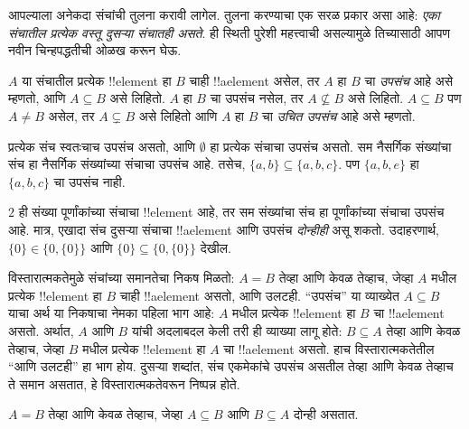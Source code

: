\documentclass[../../../include/open-logic-section]{subfiles}
\begin{document}

\begin{explain}
आपल्याला अनेकदा संचांची तुलना करावी लागेल. तुलना करण्याचा एक सरळ प्रकार
असा आहे: \emph{एका संचातील प्रत्येक वस्तू दुसऱ्या संचातही असते}.
ही स्थिती पुरेशी महत्त्वाची असल्यामुळे तिच्यासाठी आपण नवीन चिन्हपद्धतीची
ओळख करून घेऊ.
\end{explain}

\begin{defn}[उपसंच]
$A$ या संचातील प्रत्येक !!{element} हा $B$ चाही !!a{element} असेल,
तर $A$ हा $B$ चा \emph{उपसंच} आहे असे म्हणतो, आणि $A \subseteq B$ असे लिहितो.
$A$ हा $B$ चा उपसंच नसेल, तर $A \not\subseteq B$ असे लिहितो.
$A \subseteq B$ पण $A \neq B$ असेल, तर $A \subsetneq B$ असे लिहितो
आणि $A$ हा $B$ चा \emph{उचित उपसंच} आहे असे म्हणतो.
\end{defn}

\begin{ex}
प्रत्येक संच स्वतःचाच उपसंच असतो, आणि $\emptyset$ हा प्रत्येक संचाचा उपसंच असतो.
सम नैसर्गिक संख्यांचा संच हा नैसर्गिक संख्यांच्या संचाचा उपसंच आहे.
तसेच, $\{ a, b \} \subseteq \{ a, b, c \}$.
पण $\{ a, b, e
\}$ हा $\{ a, b, c \}$ चा उपसंच नाही.
\end{ex}

\begin{ex}
$2$ ही संख्या पूर्णांकांच्या संचाचा !!{element} आहे, तर सम संख्यांचा संच
हा पूर्णांकांच्या संचाचा उपसंच आहे. मात्र, एखादा संच दुसऱ्या संचाचा
!!a{element} आणि उपसंच \emph{दोन्हीही} असू शकतो. उदाहरणार्थ,
$\{0\} \in \{0, \{0\}\}$ आणि $\{0\} \subseteq \{0,
\{0\}\}$ देखील.
\end{ex}

विस्तारात्मकतेमुळे संचांच्या समानतेचा निकष मिळतो: $A = B$ तेव्हा आणि केवळ तेव्हाच,
जेव्हा $A$ मधील प्रत्येक !!{element} हा $B$ चाही !!a{element} असतो, आणि उलटही.
``उपसंच'' या व्याख्येत $A \subseteq B$ याचा अर्थ या निकषाचा नेमका पहिला
भाग आहे: $A$ मधील प्रत्येक !!{element} हा $B$ चा !!a{element} असतो.
अर्थात, $A$ आणि $B$ यांची अदलाबदल केली तरी ही व्याख्या लागू होते:
$B \subseteq A$ तेव्हा आणि केवळ तेव्हाच, जेव्हा $B$ मधील प्रत्येक !!{element}
हा $A$ चा !!a{element} असतो. हाच विस्तारात्मकतेतील ``आणि उलटही'' हा भाग होय.
दुसऱ्या शब्दांत, संच एकमेकांचे उपसंच असतील तेव्हा आणि केवळ तेव्हाच ते समान
असतात, हे विस्तारात्मकतेवरून निष्पन्न होते.

\begin{prop}
$A = B$ तेव्हा आणि केवळ तेव्हाच, जेव्हा $A \subseteq B$ आणि $B \subseteq A$ दोन्ही असतात.
\end{prop}
\end{document}
